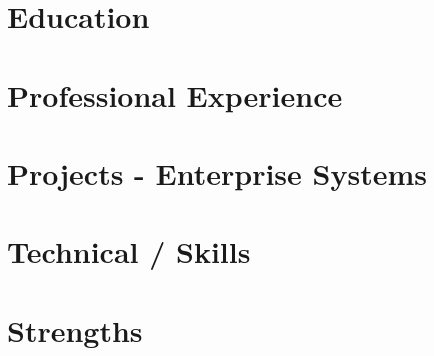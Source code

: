 \documentclass[letterpaper,11pt]{article}
\begin{document}



\section{Education}


\section{Professional Experience}



\pagebreak
\section{Projects - Enterprise Systems}



\section{Technical / Skills}


\section{Strengths}


\end{document}
